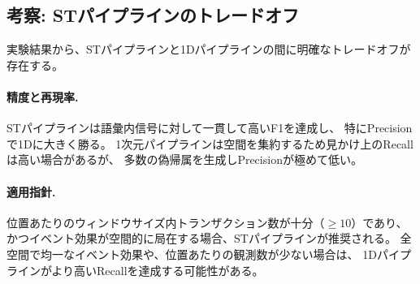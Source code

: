 \subsection{考察: STパイプラインのトレードオフ}\label{sec:discussion}

実験結果から、STパイプラインと1Dパイプラインの間に明確なトレードオフが存在する。

\paragraph{精度と再現率.}
STパイプラインは語彙内信号に対して一貫して高いF1を達成し、
特にPrecisionで1Dに大きく勝る。
1次元パイプラインは空間を集約するため見かけ上のRecallは高い場合があるが、
多数の偽帰属を生成しPrecisionが極めて低い。

\paragraph{適用指針.}
位置あたりのウィンドウサイズ内トランザクション数が十分（$\geq 10$）であり、
かつイベント効果が空間的に局在する場合、STパイプラインが推奨される。
全空間で均一なイベント効果や、位置あたりの観測数が少ない場合は、
1Dパイプラインがより高いRecallを達成する可能性がある。
